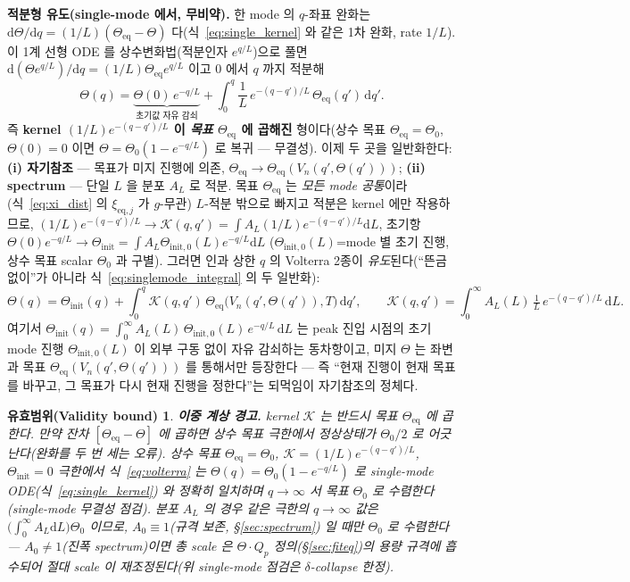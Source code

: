\documentclass[11pt,a4paper]{article}
\newtheorem*{boundbox}{유효범위(Validity bound)}
\newcommand{\dd}{\mathrm{d}}
\newcommand{\eq}{\mathrm{eq}}
\begin{document}
\textbf{적분형 유도(single-mode 에서, 무비약).} 한 mode 의 $q$-좌표 완화는 $\dd\Theta/\dd q=(1/L)(\Theta_\eq-\Theta)$
다(식~\eqref{eq:single_kernel} 와 같은 1차 완화, rate $1/L$). 이 1계 선형 ODE 를 상수변화법(적분인자 $e^{q/L}$)으로
풀면 $\dd(\Theta e^{q/L})/\dd q=(1/L)\Theta_\eq e^{q/L}$ 이고 $0$ 에서 $q$ 까지 적분해
\begin{equation}
\Theta(q)=\underbrace{\Theta(0)\,e^{-q/L}}_{\text{초기값 자유 감쇠}}+\int_0^q \frac1L\,e^{-(q-q')/L}\,\Theta_\eq(q')\,\dd q'.
\label{eq:singlemode_integral}
\end{equation}
즉 \textbf{kernel $(1/L)e^{-(q-q')/L}$ 이 \emph{목표} $\Theta_\eq$ 에 곱해진} 형이다(상수 목표 $\Theta_\eq=\Theta_0$,
$\Theta(0)=0$ 이면 $\Theta=\Theta_0(1-e^{-q/L})$ 로 복귀 — 무결성). 이제 두 곳을 일반화한다: \textbf{(i) 자기참조} —
목표가 미지 진행에 의존, $\Theta_\eq\to\Theta_\eq(V_n(q',\Theta(q')))$; \textbf{(ii) spectrum} — 단일 $L$ 을
분포 $A_L$ 로 적분. 목표 $\Theta_\eq$ 는 \emph{모든 mode 공통}이라(식~\eqref{eq:xi_dist} 의 $\xi_{\eq,j}$ 가
$g$-무관) $L$-적분 밖으로 빠지고 적분은 kernel 에만 작용하므로, $(1/L)e^{-(q-q')/L}\to\mathcal K(q,q')=\int
A_L(1/L)e^{-(q-q')/L}\dd L$, 초기항 $\Theta(0)e^{-q/L}\to\Theta_\mathrm{init}=\int A_L\Theta_{\mathrm{init},0}(L)e^{-q/L}\dd L$
($\Theta_{\mathrm{init},0}(L)$=mode 별 초기 진행, 상수 목표 scalar $\Theta_0$ 과 구별). 그러면 인과 상한 $q$ 의 Volterra 2종이
\emph{유도}된다(``뜬금없이''가 아니라 식~\eqref{eq:singlemode_integral} 의 두 일반화):
\begin{equation}
\Theta(q)=\Theta_\mathrm{init}(q)+\int_0^q \mathcal K(q,q')\,\Theta_\eq\big(V_n(q',\Theta(q')),T\big)\,\dd q',
\qquad \mathcal K(q,q')=\int_0^\infty A_L(L)\,\tfrac1L\,e^{-(q-q')/L}\,\dd L.
\label{eq:volterra}
\end{equation}
여기서 $\Theta_\mathrm{init}(q)=\int_0^\infty A_L(L)\,\Theta_{\mathrm{init},0}(L)\,e^{-q/L}\,\dd L$ 는 peak 진입 시점의 초기 mode
진행 $\Theta_{\mathrm{init},0}(L)$ 이 외부 구동 없이 자유 감쇠하는 동차항이고, 미지 $\Theta$ 는 좌변과 목표
$\Theta_\eq(V_n(q',\Theta(q')))$ 를 통해서만 등장한다 — 즉 ``현재 진행이 현재 목표를 바꾸고, 그 목표가 다시
현재 진행을 정한다''는 되먹임이 자기참조의 정체다.
\begin{boundbox}
\textbf{이중 계상 경고.} kernel $\mathcal K$ 는 반드시 \emph{목표} $\Theta_\eq$ 에 곱한다. 만약 잔차
$[\Theta_\eq-\Theta]$ 에 곱하면 상수 목표 극한에서 정상상태가 $\Theta_0/2$ 로 어긋난다(완화를 두 번 세는
오류). 상수 목표 $\Theta_\eq=\Theta_0$, $\mathcal K=(1/L)e^{-(q-q')/L}$, $\Theta_\mathrm{init}=0$ 극한에서
식~\eqref{eq:volterra} 는 $\Theta(q)=\Theta_0(1-e^{-q/L})$ 로 single-mode ODE(식~\eqref{eq:single_kernel})
와 정확히 일치하며 $q\to\infty$ 서 목표 $\Theta_0$ 로 수렴한다(single-mode 무결성 점검). \emph{분포} $A_L$ 의 경우
같은 극한의 $q\to\infty$ 값은 $\big(\int_0^\infty A_L\dd L\big)\Theta_0$ 이므로, $A_0\equiv1$(규격 보존, \S\ref{sec:spectrum})
일 때만 $\Theta_0$ 로 수렴한다 — $A_0\ne1$(진폭 spectrum)이면 총 scale 은 $\Theta\cdot Q_p$ 정의(\S\ref{sec:fiteq})의
용량 규격에 흡수되어 절대 scale 이 재조정된다(위 single-mode 점검은 $\delta$-collapse 한정).
\end{boundbox}
\end{document}
